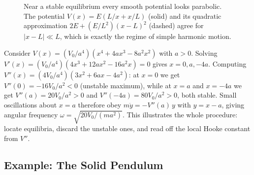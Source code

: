 \begin{figure}[ht]
    \centering
    \caption{Near a stable equilibrium every smooth potential looks parabolic. The potential $V(x)=E(L/x+x/L)$ (solid) and its quadratic approximation $2E + (E/L^2)(x-L)^2$ (dashed) agree for $|x-L|\ll L$, which is exactly the regime of simple harmonic motion.}
    \label{fig:small-osc}
\end{figure}

\begin{example}
Consider $V(x) = (V_0/a^4)(x^4 + 4ax^3 - 8a^2 x^2)$ with $a > 0$. Solving $V'(x) = (V_0/a^4)(4x^3 + 12ax^2 - 16a^2 x) = 0$ gives $x = 0, a, -4a$. Computing $V''(x) = (4V_0/a^4)(3x^2 + 6ax - 4a^2)$: at $x=0$ we get $V''(0) = -16V_0/a^2 < 0$ (unstable maximum), while at $x = a$ and $x = -4a$ we get $V''(a) = 20V_0/a^2 > 0$ and $V''(-4a) = 80V_0/a^2 > 0$, both stable. Small oscillations about $x = a$ therefore obey $m\ddot{y} = -V''(a)\,y$ with $y = x - a$, giving angular frequency $\omega = \sqrt{20 V_0/(m a^2)}$. This illustrates the whole procedure: locate equilibria, discard the unstable ones, and read off the local Hooke constant from $V''$.
\end{example}

\subsection{Example: The Solid Pendulum}

